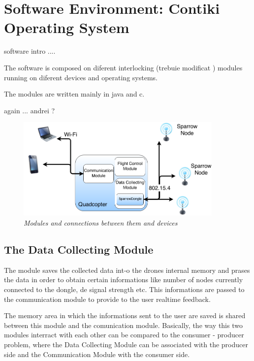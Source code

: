 \normalfont\normalsize
\chapter{Software Environment: Contiki Operating System}

software intro ....


The software is composed on diferent interlocking (trebuie modificat ) modules running on diferent devices and operating systems.

The modules are written mainly in java and c.

again ... andrei ?

\begin{figure}[ht]
\begin{center}
\includegraphics[width=0.9\textwidth]{sw_platform/organigrama.png}
\end{center}
\caption{\small \itshape{Modules and connections between them and devices}}
\end{figure}


\clearpage

\section{The Data Collecting Module}

The module saves the collected data int-o the drones internal memory and prases the data in order to obtain certain informations like number of nodes currently connected to the dongle, de signal strength etc. This informations are passed to the communication module to provide to the user realtime feedback.

The memory area in which the informations sent to the user are saved is shared between this module and the comunication module. Basically, the way this two modules interract with each other can be compared to the consumer - producer problem, where the Data Collecting Module can be associated with the producer side and the Communication Module with the consumer side.

